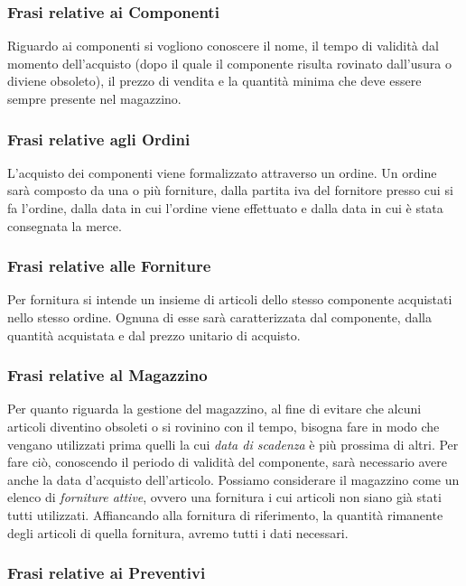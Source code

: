 		\subsubsection{Frasi relative ai Componenti}
			
			Riguardo ai componenti si vogliono conoscere il nome, il tempo di validità dal momento dell'acquisto (dopo il quale il componente risulta rovinato dall'usura o diviene obsoleto), il prezzo di vendita e la quantità minima che deve essere sempre presente nel magazzino.
			
		\subsubsection{Frasi relative agli Ordini}
		
			L'acquisto dei componenti viene formalizzato attraverso un ordine. Un ordine sarà composto da una o più forniture, dalla partita iva del fornitore presso cui si fa l'ordine, dalla data in cui l'ordine viene effettuato e dalla data in cui è stata consegnata la merce.
		
		\subsubsection{Frasi relative alle Forniture}
		
			Per fornitura si intende un insieme di articoli dello stesso componente acquistati nello stesso ordine. Ognuna di esse sarà caratterizzata dal componente, dalla quantità acquistata e dal prezzo unitario di acquisto.
			
		\subsubsection{Frasi relative al Magazzino}
			
			Per quanto riguarda la gestione del magazzino, al fine di evitare che alcuni articoli diventino obsoleti o si rovinino con il tempo, bisogna fare in modo che vengano utilizzati prima quelli la cui \emph{data di scadenza} è più prossima di altri. Per fare ciò, conoscendo il periodo di validità del componente, sarà necessario avere anche la data d'acquisto dell'articolo.
			Possiamo considerare il magazzino come un elenco di \emph{forniture attive}, ovvero una fornitura i cui articoli non siano già stati tutti utilizzati. Affiancando alla fornitura di riferimento, la quantità rimanente degli articoli di quella fornitura, avremo tutti i dati necessari.
			
		\subsubsection{Frasi relative ai Preventivi}
			
